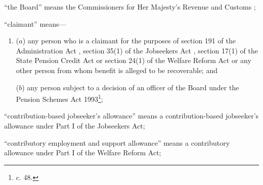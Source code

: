 \documentclass[12pt,a4paper]{article}
\begin{document}
\begin{enumerate}
“the Board” means the Commissioners 
for Her Majesty’s Revenue and Customs%
;

“claimant” means—
\begin{enumerate}\item[]
($a$) any person who is a claimant for the purposes of section 191 of the Administration Act%
, section 35(1) of the Jobseekers Act%
, section 17(1) of the State Pension Credit Act or section 24(1) of the Welfare Reform Act  %
or any other person from whom benefit is alleged to be recoverable; and

($b$) any person subject to a decision of 
an officer of the Board  %
under the Pension Schemes Act 1993\footnote{ c. 48.};
\end{enumerate}



“contribution-based jobseeker’s allowance” means a contribution-based jobseeker’s allowance under Part I of the Jobseekers Act;

“contributory employment and support allowance” means a contributory allowance under Part I of the Welfare Reform Act;

%
%
%


\end{enumerate}
\end{document}
